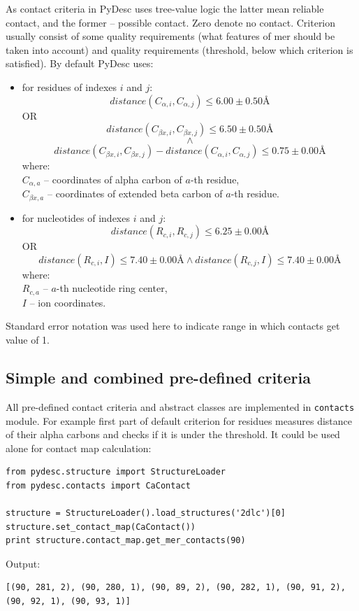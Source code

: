 \documentclass{article}
\begin{document}
As contact criteria in PyDesc uses tree-value logic the latter mean reliable contact, and the former -- possible contact. Zero denote no contact. Criterion usually consist of some quality requirements (what features of mer should be taken into account) and quality requirements (threshold, below which criterion is satisfied). By default PyDesc uses:
\begin{itemize}
    \item for residues of indexes $i$ and $j$:
    $$distance(C_{\alpha{}, i}, C_{\alpha{}, j}) \leq 6.00 \pm 0.50 \textrm{\AA}$$
    OR
    $$distance(C_{\beta{}x, i}, C_{\beta{}x, j}) \leq 6.50 \pm 0.50 \textrm{\AA}$$
    $$\land$$
    $$distance(C_{\beta{}x, i}, C_{\beta{}x, j}) - distance(C_{\alpha{}, i}, C_{\alpha{}, j}) \leq 0.75 \pm 0.00 \textrm{\AA}$$
    where:\\
    $C_{\alpha{}, a}$ -- coordinates of alpha carbon of $a$-th residue,\\
    $C_{\beta{}x, a}$ -- coordinates of extended beta carbon of $a$-th residue.
    \item for nucleotides of indexes $i$ and $j$:
    $$distance(R_{c, i}, R_{c, j}) \leq 6.25 \pm 0.00 \textrm{\AA}$$
    OR
    $$distance(R_{c, i}, I) \leq 7.40 \pm 0.00 \textrm{\AA} \land{} distance(R_{c, j}, I) \leq 7.40 \pm 0.00 \textrm{\AA}$$
    where:\\
    $R_{c, a}$ -- $a$-th nucleotide ring center,\\
    $I$ -- ion coordinates.
\end{itemize}

Standard error notation was used here to indicate range in which contacts get value of 1.

%
%
\subsection{Simple and combined pre-defined criteria}

All pre-defined contact criteria and abstract classes are implemented in \texttt{contacts} module. For example first part of default criterion for residues measures distance of their alpha carbons and checks if it is under the threshold. It could be used alone for contact map calculation:

\begin{lstlisting}
from pydesc.structure import StructureLoader
from pydesc.contacts import CaContact

structure = StructureLoader().load_structures('2dlc')[0]
structure.set_contact_map(CaContact())
print structure.contact_map.get_mer_contacts(90)
\end{lstlisting}
Output:
\begin{lstlisting}
[(90, 281, 2), (90, 280, 1), (90, 89, 2), (90, 282, 1), (90, 91, 2), (90, 92, 1), (90, 93, 1)]
\end{lstlisting}
\end{document}
